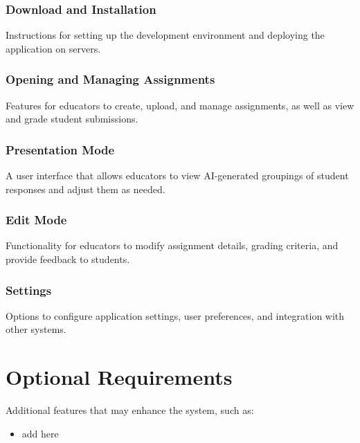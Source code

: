 \documentclass[ms,twoside,print]{nuthesis}
\begin{document}
\subsection{Download and Installation}
Instructions for setting up the development environment and deploying the application on servers.

\subsection{Opening and Managing Assignments}
Features for educators to create, upload, and manage assignments, as well as view and grade student submissions.

\subsection{Presentation Mode}
A user interface that allows educators to view AI-generated groupings of student responses and adjust them as needed.

\subsection{Edit Mode}
Functionality for educators to modify assignment details, grading criteria, and provide feedback to students.

\subsection{Settings}
Options to configure application settings, user preferences, and integration with other systems.

\chapter{Optional Requirements}
Additional features that may enhance the system, such as:
\begin{itemize}
    \item add here
\end{itemize}

\backmatter



\end{document}
